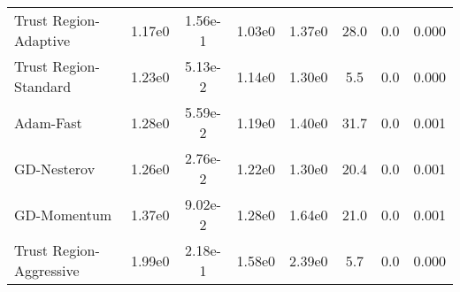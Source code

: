 \documentclass{article}
\begin{document}
\begin{table}[htbp]
{\begin{tabular}{p{2.5cm}*{7}{c}}
Trust Region-Adaptive & 1.17e0 & 1.56e-1 & 1.03e0 & 1.37e0 & 28.0 & 0.0 & 0.000 \\
Trust Region-Standard & 1.23e0 & 5.13e-2 & 1.14e0 & 1.30e0 & 5.5 & 0.0 & 0.000 \\
Adam-Fast & 1.28e0 & 5.59e-2 & 1.19e0 & 1.40e0 & 31.7 & 0.0 & 0.001 \\
GD-Nesterov & 1.26e0 & 2.76e-2 & 1.22e0 & 1.30e0 & 20.4 & 0.0 & 0.001 \\
GD-Momentum & 1.37e0 & 9.02e-2 & 1.28e0 & 1.64e0 & 21.0 & 0.0 & 0.001 \\
Trust Region-Aggressive & 1.99e0 & 2.18e-1 & 1.58e0 & 2.39e0 & 5.7 & 0.0 & 0.000 \\
\bottomrule
\end{tabular}
}
\end{table}
\end{document}
